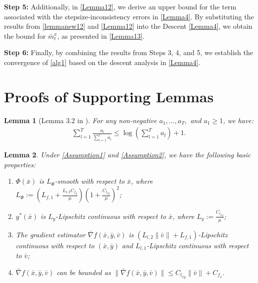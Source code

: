 \documentclass{article}
\theoremstyle{plain}
\newtheorem{lemma}[lemma]{Lemma}
\theoremstyle{definition}
\theoremstyle{remark}
\begin{document}
\textbf{Step 5:} Additionally, in \cref{Lemma12}, we derive an upper bound for the term associated with the stepsize-inconsistency errors in \cref{Lemma4}. By substituting the results from \cref{lemmanew12} and \cref{Lemma12} into the Descent \cref{Lemma4}, we obtain the bound for \(\bar{m}^x_t\), as presented in \cref{Lemma13}.

\textbf{Step 6:} Finally, by combining the results from Steps 3, 4, and 5, we establish the convergence of \cref{alg1} based on the descent analysis in \cref{Lemma4}.

\section{Proofs of Supporting Lemmas}
\begin{lemma}[Lemma 3.2 in \citep{ward2020adagrad}]\label{Lemma1}
For any non-negative $a_1, \dots, a_T,$ and $a_1 \geq 1$, we have:
\begin{align}
\sum_{l=1}^T \frac{a_l}{\sum_{i=1}^l a_i} \leq \log \left(\sum_{l=1}^T a_l\right) + 1.\label{eq21}
\end{align}
\end{lemma}

  \begin{lemma}\label{Lemma2} Under \cref{Assumption1} and \cref{Assumption2}, we have the following basic properties:
\begin{enumerate}
    \item[1).] \(\Phi(\bar{x})\) is \(L_{\Phi}\)-smooth with respect to \(\bar{x}\), where 
    $L_{\Phi} := \left(L_{f,1} + \frac{L_{l,2} C_{f_y}}{\mu} \right)\left(1 + \frac{C_{l_{xy}}}{\mu}\right)^2$;
    \item[2).] \({y}^*(\bar{x})\) is \(L_y\)-Lipschitz continuous with respect to \(\bar{x}\), where $L_y := \frac{C_{l_{xy}}}{\mu}$;
    \item[3).] The gradient estimator \(\bar{\nabla} f(\bar{x}, \bar{y}, \bar{v})\) is \((L_{l,2} \|\bar{v}\| + L_{f,1})\)-Lipschitz continuous with respect to \((\bar{x}, \bar{y})\) and \(L_{l,1}\)-Lipschitz continuous with respect to \(\bar{v}\);
    \item[4).] \(\bar{\nabla} f(\bar{x}, \bar{y}, \bar{v})\) can be bounded as $\|\bar{\nabla} f(\bar{x}, \bar{y}, \bar{v})\| \leq C_{l_{xy}} \|\bar{v}\| + C_{f_x}.$
\end{enumerate}
\end{lemma}
\end{document}
